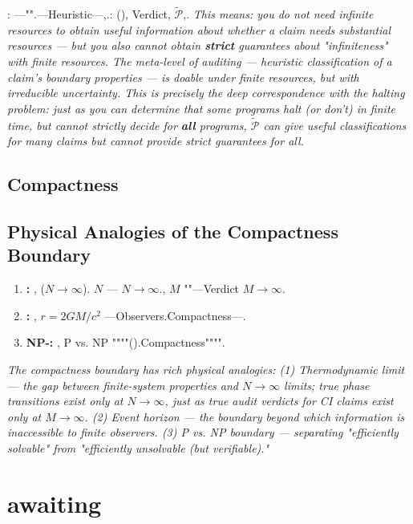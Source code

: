 \documentclass[12pt,a4paper]{article}
\theoremstyle{plain}
\theoremstyle{definition}
\theoremstyle{remark}
\begin{document}
\vspace{6pt}
: ---""\emph{}.---Heuristic---,.: (), \emph{}Verdict, $\widetilde{\mathcal{P}}$,.
\vspace{4pt}
\noindent
\textit{This means: you do not need infinite resources to obtain useful information about whether a claim needs substantial resources --- but you also cannot obtain \textbf{strict} guarantees about "infiniteness" with finite resources. The meta-level of auditing --- heuristic classification of a claim's boundary properties --- is doable under finite resources, but with irreducible uncertainty. This is precisely the deep correspondence with the halting problem: just as you can determine that some programs halt (or don't) in finite time, but cannot strictly decide for \textbf{all} programs, $\widetilde{\mathcal{P}}$ can give useful classifications for many claims but cannot provide strict guarantees for all.}
\subsection{Compactness}
\subsection{Physical Analogies of the Compactness Boundary}
\begin{enumerate}[label=(\arabic*)]
 \item \textbf{: }, ($N \to \infty$). $N$ --- $N \to \infty$., $M$ ""---Verdict $M \to \infty$.
 \item \textbf{: }, $r = 2GM/c^2$ ---Observers.Compactness---.
 \item \textbf{NP-: }, P vs. NP """"().Compactness"""".
\end{enumerate}
\vspace{4pt}
\noindent
\textit{The compactness boundary has rich physical analogies: (1) Thermodynamic limit --- the gap between finite-system properties and $N\to\infty$ limits; true phase transitions exist only at $N\to\infty$, just as true audit verdicts for CI claims exist only at $M\to\infty$. (2) Event horizon --- the boundary beyond which information is inaccessible to finite observers. (3) P vs. NP boundary --- separating "efficiently solvable" from "efficiently unsolvable (but verifiable)."}
\newpage
\section{awaiting}
\end{document}
